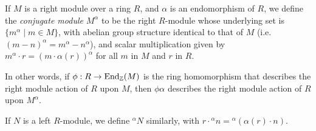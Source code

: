 \documentclass[12pt]{article}
\begin{document}
If $M$ is a right module over a ring $R$,
and $\alpha$ is an endomorphism of $R$,
we define the {\it conjugate module} $M^\alpha$ 
to be the right $R$-module
whose underlying set is $\{ m^\alpha \mid m \in M \}$,
with abelian group structure identical to that of $M$
(i.e. $(m-n)^\alpha = m^\alpha - n^\alpha$),
and scalar multiplication given by
${m^\alpha} \cdot r = (m \cdot \alpha(r))^\alpha$
for all $m$ in $M$ and $r$ in $R$. 

In other words, if $\phi: R \to {\rm End}_{\Bbb Z}(M)$
is the ring homomorphism that describes 
the right module action of $R$ upon $M$,
then $\phi \alpha$ describes
the right module action of $R$ upon $M^\alpha$.


If $N$ is a left $R$-module, we define ${^\alpha N}$ similarly,
with $r \cdot {^\alpha n} = {^\alpha(\alpha(r) \cdot n)}$.
\end{document}
